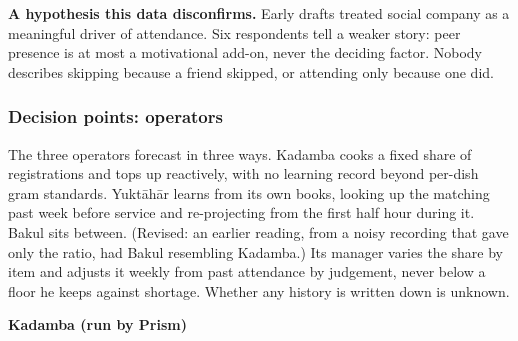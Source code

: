 \documentclass[
  10pt,
  table]{article}
\begin{document}
\textbf{A hypothesis this data disconfirms.} Early drafts treated social company as a meaningful driver of attendance. Six respondents tell a weaker story: peer presence is at most a motivational add-on, never the deciding factor. Nobody describes skipping because a friend skipped, or attending only because one did.

\subsubsection{Decision points: operators}\label{decision-points-operators}

The three operators forecast in three ways. Kadamba cooks a fixed share of registrations and tops up reactively, with no learning record beyond per-dish gram standards. Yuktāhār learns from its own books, looking up the matching past week before service and re-projecting from the first half hour during it. Bakul sits between. (Revised: an earlier reading, from a noisy recording that gave only the ratio, had Bakul resembling Kadamba.) Its manager varies the share by item and adjusts it weekly from past attendance by judgement, never below a floor he keeps against shortage. Whether any history is written down is unknown.

\textbf{Kadamba (run by Prism)}
\end{document}
